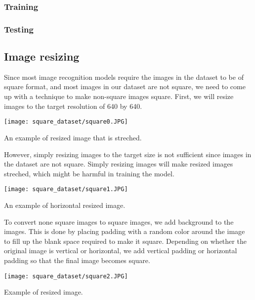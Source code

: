 \subsubsection{Training}

\subsubsection{Testing}

\newpage
\subsection{Image resizing}
Since most image recognition models require the images in the dataset to be of square format, and most images in our dataset are not square, we need to come up with a technique to make non-square images square. First, we will resize images to the target resolution of 640 by 640.
\begin{marginfigure} %
	\texttt{[image: square\_dataset/square0.JPG]}
	\caption{An example of resized image that is streched.}
\end{marginfigure}

However, simply resizing images to the target size is not sufficient since images in the dataset are not square. Simply resizing images will make resized images streched, which might be harmful in training the model.

\begin{marginfigure} %
	\texttt{[image: square\_dataset/square1.JPG]}
	\caption{An example of horizontal resized image.}
\end{marginfigure}

To convert none square images to square images, we add background to the images. This is done by placing padding with a random color around the image to fill up the blank space required to make it square.
Depending on whether the original image is vertical or horizontal, we add vertical padding or horizontal padding so that the final image becomes square.


\begin{marginfigure} %
	\texttt{[image: square\_dataset/square2.JPG]}
	\caption{Example of resized image.}
\end{marginfigure}

